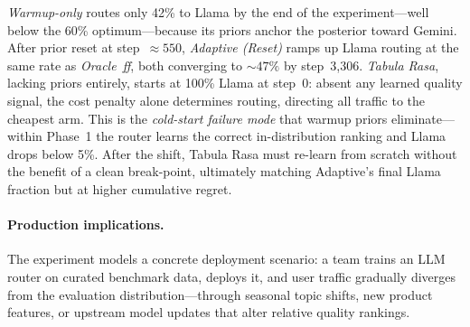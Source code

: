 \emph{Warmup-only} routes only 42\% to Llama by the end of the
experiment---well below the 60\% optimum---because its priors anchor
the posterior toward Gemini.
After prior reset at step~${\approx}550$, \emph{Adaptive (Reset)}
ramps up Llama routing at the same rate as \emph{Oracle~ff},
both converging to ${\sim}47\%$ by step~3{,}306.
\emph{Tabula Rasa}, lacking priors entirely, starts at 100\% Llama
at step~0: absent any learned quality signal, the cost penalty
alone determines routing, directing all traffic to the cheapest arm.
This is the \emph{cold-start failure mode} that warmup priors
eliminate---within Phase~1 the router learns the correct
in-distribution ranking and Llama drops below 5\%.
After the shift, Tabula Rasa must re-learn from scratch without the
benefit of a clean break-point, ultimately matching Adaptive's final
Llama fraction but at higher cumulative regret.

\paragraph{Production implications.}
The experiment models a concrete deployment scenario: a team trains
an LLM router on curated benchmark data, deploys it, and user traffic
gradually diverges from the evaluation distribution---through seasonal
topic shifts, new product features, or upstream model updates that
alter relative quality rankings.

